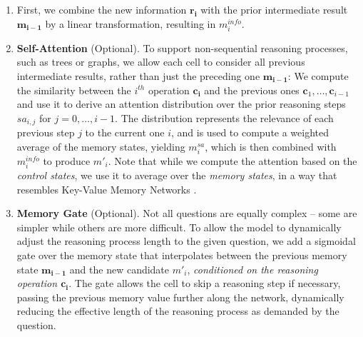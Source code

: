 \documentclass[fleqn]{article}
\begin{document}
\begin{enumerate}
\item First, we combine the new information \(\boldsymbol{r_i}\) with the prior intermediate result \(\boldsymbol{m_{i-1}}\) by a linear transformation, resulting in \({m_{i}^{info}}\).

\item \textbf{Self-Attention} (Optional). To support non-sequential reasoning processes, such as trees or graphs, we allow each cell to consider all previous intermediate results, rather than just the preceding one \(\boldsymbol{m_{i-1}}\): We compute the similarity between the \(i^{th}\) operation \(\boldsymbol{c_i}\) and the previous ones \({\boldsymbol{c}_1,\ldots,\boldsymbol{c}_{i-1}}\) and use it to derive an attention distribution over the prior reasoning steps \({\mathit{sa}_{i,j}}\) for \(j = 0,\ldots,{i-1}\). The distribution represents the relevance of each previous step \(j\) to the current one \(i\), and is used to compute a weighted average of the memory states, yielding \({m_{i}^{sa}}\), which is then combined with \({m_{i}^{info}}\) to produce \({m'_{i}}\). Note that while we compute the attention based on the \textit{control states}, we use it to average over the \textit{memory states}, in a way that resembles Key-Value Memory Networks \citep{kvmn}.

\item \textbf{Memory Gate} (Optional). Not all questions are equally complex -- some are simpler while others are more difficult. To allow the model to dynamically adjust the reasoning process length to the given question, we add a sigmoidal gate over the memory state that interpolates between the previous memory state \(\boldsymbol{m_{i-1}}\) and the new candidate \({m'_{i}}\), \textit{conditioned on the reasoning operation \(\boldsymbol{c_{i}}\)}. The gate allows the cell to skip a reasoning step if necessary, passing the previous memory value further along the network, dynamically reducing the effective length of the reasoning process as demanded by the question.

\end{enumerate}
\end{document}

